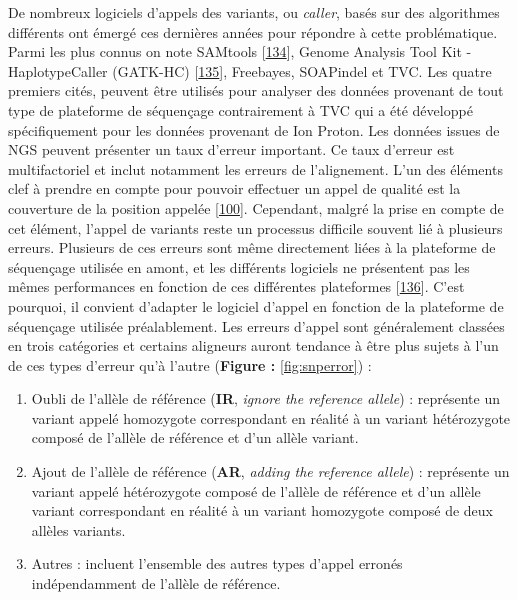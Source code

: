 \documentclass[12pt,twoside]{reedthesis}
\theoremstyle{definition}
\theoremstyle{definition}
\theoremstyle{remark}
\begin{document}
  De nombreux logiciels d'appels des variants, ou \emph{caller}, basés sur
  des algorithmes différents ont émergé ces dernières années pour répondre
  à cette problématique. Parmi les plus connus on note SAMtools
  {[}\protect\hyperlink{ref-Li2009}{134}{]}, Genome Analysis Tool Kit -
  HaplotypeCaller (GATK-HC)
  {[}\protect\hyperlink{ref-McKenna2010}{135}{]}, Freebayes, SOAPindel et
  TVC. Les quatre premiers cités, peuvent être utilisés pour analyser des
  données provenant de tout type de plateforme de séquençage contrairement
  à TVC qui a été développé spécifiquement pour les données provenant de
  Ion Proton. Les données issues de NGS peuvent présenter un taux d'erreur
  important. Ce taux d'erreur est multifactoriel et inclut notamment les
  erreurs de l'alignement. L'un des éléments clef à prendre en compte pour
  pouvoir effectuer un appel de qualité est la couverture de la position
  appelée {[}\protect\hyperlink{ref-Sims2014}{100}{]}. Cependant, malgré
  la prise en compte de cet élément, l'appel de variants reste un
  processus difficile souvent lié à plusieurs erreurs. Plusieurs de ces
  erreurs sont même directement liées à la plateforme de séquençage
  utilisée en amont, et les différents logiciels ne présentent pas les
  mêmes performances en fonction de ces différentes plateformes
  {[}\protect\hyperlink{ref-Hwang2015}{136}{]}. C'est pourquoi, il
  convient d'adapter le logiciel d'appel en fonction de la plateforme de
  séquençage utilisée préalablement. Les erreurs d'appel sont généralement
  classées en trois catégories et certains aligneurs auront tendance à
  être plus sujets à l'un de ces types d'erreur qu'à l'autre
  (\textbf{Figure : }\ref{fig:snperror}) :
  
  \begin{enumerate}
  \def\labelenumi{\arabic{enumi}.}
  \item
    Oubli de l'allèle de référence (\textbf{IR}, \emph{ignore the
    reference allele}) : représente un variant appelé homozygote
    correspondant en réalité à un variant hétérozygote composé de l'allèle
    de référence et d'un allèle variant.
  \item
    Ajout de l'allèle de référence (\textbf{AR}, \emph{adding the
    reference allele}) : représente un variant appelé hétérozygote composé
    de l'allèle de référence et d'un allèle variant correspondant en
    réalité à un variant homozygote composé de deux allèles variants.
  \item
    Autres : incluent l'ensemble des autres types d'appel erronés
    indépendamment de l'allèle de référence.
  \end{enumerate}
  
\end{document}
